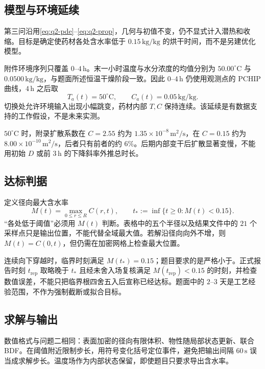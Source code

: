 \subsection{模型与环境延续}

第三问沿用\eqref{eq:q2-pde}--\eqref{eq:q2-prop}，几何与初值不变，仍不显式计入潜热和收缩。目标是确定使药材各处含水率低于 $0.15\,\mathrm{kg/kg}$ 的烘干时间，而不是另建优化模型。

附件环境序列只覆盖 $0$--$4\,\mathrm{h}$。末一小时温度与水分浓度的均值分别为 $50.00^\circ\mathrm{C}$ 与 $0.0500\,\mathrm{kg/kg}$，与题面所述恒温干燥阶段一致。因此 $0$--$4\,\mathrm{h}$ 仍使用观测点的 PCHIP 曲线，$4\,\mathrm{h}$ 之后取
\[
T_a(t)=50^\circ\mathrm{C},\qquad C_a(t)=0.05\,\mathrm{kg/kg}.
\]
切换处允许环境输入出现小幅跳变，药材内部 $T,C$ 保持连续。该延续是有数据支持的工作假设，不是未来实测。

$50^\circ\mathrm{C}$ 时，附录扩散系数在 $C=2.55$ 约为 $1.35\times10^{-8}\,\mathrm{m^2/s}$，在 $C=0.15$ 约为 $8.00\times10^{-10}\,\mathrm{m^2/s}$，后者只有前者的约 $6\%$。后期内部变干后扩散显著变慢，不能用初始 $D$ 或前 $3\,\mathrm{h}$ 的下降斜率外推总时长。

\subsection{达标判据}

定义径向最大含水率
\begin{equation}
M(t)=\max_{0\le r\le R}C(r,t),\qquad
t_*:=\inf\{t\ge0:M(t)<0.15\}.
\label{eq:q3-event}
\end{equation}
``各处低于阈值''必须用 $M(t)$ 判断。表格中的五个半径以及结果文件中的 $21$ 个采样点只是输出位置，不能代替全域最大值。若解沿径向向外不增，则 $M(t)=C(0,t)$，但仍需在加密网格上检查最大位置。

连续向下穿越时，临界时刻满足 $M(t_*)=0.15$；题目要求的是严格小于。正式报告时刻 $t_{\mathrm{rep}}$ 取略晚于 $t_*$ 且经未舍入场复核满足 $M(t_{\mathrm{rep}})<0.15$ 的时刻，并检查数值误差，不能只把临界根四舍五入后宣称已经达标。题面中的 $2$--$3$ 天是工艺经验范围，不作为强制截断或拟合目标。

\subsection{求解与输出}

数值格式与问题二相同：表面加密的径向有限体积、物性随局部状态更新、联合 BDF。在阈值附近限制步长，用符号变化括号定位事件，避免把输出间隔 $60\,\mathrm{s}$ 误当成求解步长。温度场作为内部状态保留，即使题目只要求导出含水率。

